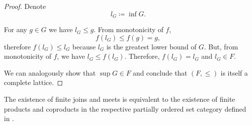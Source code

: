 \begin{proof}
  Denote
  \begin{equation*}
    l_G \coloneqq \inf G.
  \end{equation*}

  For any \( g \in G \) we have \( l_G \leq g \). From monotonicity of \( f \),
  \begin{equation*}
    f(l_G) \leq f(g) = g,
  \end{equation*}
  therefore \( f(l_G) \leq l_G \) because \( l_G \) is the greatest lower bound of \( G \). But, from monotonicity of \( f \), we have \( l_G \leq f(l_G) \). Therefore, \( f(l_G) = l_G \) and \( l_G \in F \).

  We can analogously show that \( \sup G \in F \) and conclude that \( (F, \leq) \) is itself a complete lattice.
\end{proof}

\begin{remark}\label{def:semilattice/lattice_categorical_product}
  The existence of finite joins and meets is equivalent to the existence of finite products and coproducts in the respective partially ordered set category defined in .
\end{remark}

